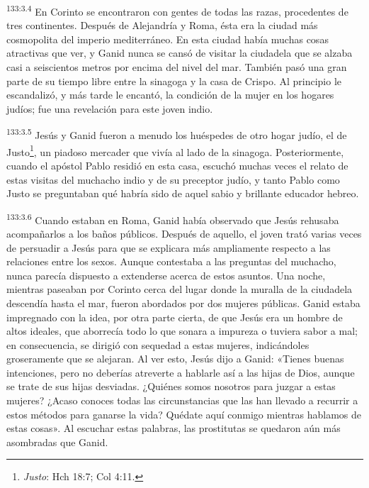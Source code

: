 \par 
\textsuperscript{133:3.4} En Corinto se encontraron con gentes de todas las razas, procedentes de tres continentes. Después de Alejandría y Roma, ésta era la ciudad más cosmopolita del imperio mediterráneo. En esta ciudad había muchas cosas atractivas que ver, y Ganid nunca se cansó de visitar la ciudadela que se alzaba casi a seiscientos metros por encima del nivel del mar. También pasó una gran parte de su tiempo libre entre la sinagoga y la casa de Crispo. Al principio le escandalizó, y más tarde le encantó, la condición de la mujer en los hogares judíos; fue una revelación para este joven indio.

\par 
\textsuperscript{133:3.5} Jesús y Ganid fueron a menudo los huéspedes de otro hogar judío, el de Justo\footnote{\textit{Justo}: Hch 18:7; Col 4:11.}, un piadoso mercader que vivía al lado de la sinagoga. Posteriormente, cuando el apóstol Pablo residió en esta casa, escuchó muchas veces el relato de estas visitas del muchacho indio y de su preceptor judío, y tanto Pablo como Justo se preguntaban qué habría sido de aquel sabio y brillante educador hebreo.

\par 
\textsuperscript{133:3.6} Cuando estaban en Roma, Ganid había observado que Jesús rehusaba acompañarlos a los baños públicos. Después de aquello, el joven trató varias veces de persuadir a Jesús para que se explicara más ampliamente respecto a las relaciones entre los sexos. Aunque contestaba a las preguntas del muchacho, nunca parecía dispuesto a extenderse acerca de estos asuntos. Una noche, mientras paseaban por Corinto cerca del lugar donde la muralla de la ciudadela descendía hasta el mar, fueron abordados por dos mujeres públicas. Ganid estaba impregnado con la idea, por otra parte cierta, de que Jesús era un hombre de altos ideales, que aborrecía todo lo que sonara a impureza o tuviera sabor a mal; en consecuencia, se dirigió con sequedad a estas mujeres, indicándoles groseramente que se alejaran. Al ver esto, Jesús dijo a Ganid: «Tienes buenas intenciones, pero no deberías atreverte a hablarle así a las hijas de Dios, aunque se trate de sus hijas desviadas. ¿Quiénes somos nosotros para juzgar a estas mujeres? ¿Acaso conoces todas las circunstancias que las han llevado a recurrir a estos métodos para ganarse la vida? Quédate aquí conmigo mientras hablamos de estas cosas». Al escuchar estas palabras, las prostitutas se quedaron aún más asombradas que Ganid.


